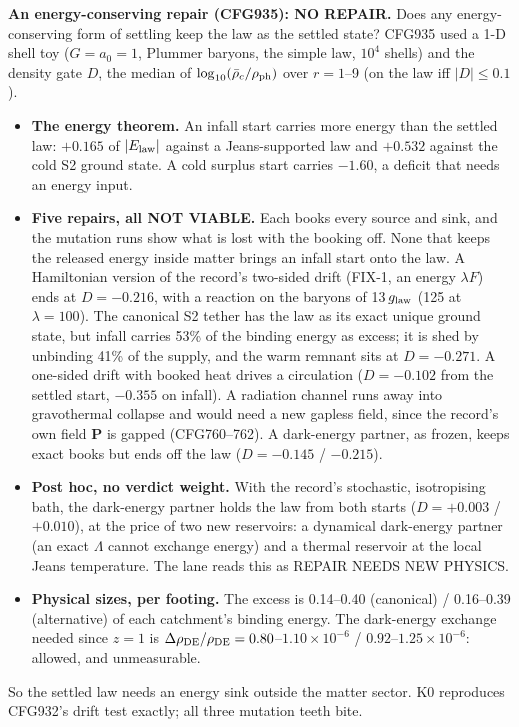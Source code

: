 \documentclass[10pt]{article}
\begin{document}
\textbf{An energy-conserving repair (CFG935): NO REPAIR.} Does any energy-conserving form of settling keep the law as the settled state? CFG935 used a 1-D shell toy ($G=a_0=1$, Plummer baryons, the simple law, $10^4$ shells) and the density gate $D$, the median of $\log_{10}(\bar\rho_c/\rho_{\rm ph})$ over $r=1$--9 (on the law iff $|D|\le0.1$).
\begin{itemize}
\item \textbf{The energy theorem.} An infall start carries more energy than the settled law: $+0.165$ of $|E_{\rm law}|$ against a Jeans-supported law and $+0.532$ against the cold S2 ground state. A cold surplus start carries $-1.60$, a deficit that needs an energy input.
\item \textbf{Five repairs, all NOT VIABLE.} Each books every source and sink, and the mutation runs show what is lost with the booking off. None that keeps the released energy inside matter brings an infall start onto the law. A Hamiltonian version of the record's two-sided drift (FIX-1, an energy $\lambda F$) ends at $D=-0.216$, with a reaction on the baryons of 13\,$g_{\rm law}$ (125 at $\lambda=100$). The canonical S2 tether has the law as its exact unique ground state, but infall carries 53\% of the binding energy as excess; it is shed by unbinding 41\% of the supply, and the warm remnant sits at $D=-0.271$. A one-sided drift with booked heat drives a circulation ($D=-0.102$ from the settled start, $-0.355$ on infall). A radiation channel runs away into gravothermal collapse and would need a new gapless field, since the record's own field $\mathbf P$ is gapped (CFG760--762). A dark-energy partner, as frozen, keeps exact books but ends off the law ($D=-0.145$ / $-0.215$).
\item \textbf{Post hoc, no verdict weight.} With the record's stochastic, isotropising bath, the dark-energy partner holds the law from both starts ($D=+0.003$ / $+0.010$), at the price of two new reservoirs: a dynamical dark-energy partner (an exact $\Lambda$ cannot exchange energy) and a thermal reservoir at the local Jeans temperature. The lane reads this as REPAIR NEEDS NEW PHYSICS.
\item \textbf{Physical sizes, per footing.} The excess is 0.14--0.40 (canonical) / 0.16--0.39 (alternative) of each catchment's binding energy. The dark-energy exchange needed since $z=1$ is $\Delta\rho_{\rm DE}/\rho_{\rm DE}=0.80$--$1.10\times10^{-6}$ / $0.92$--$1.25\times10^{-6}$: allowed, and unmeasurable.
\end{itemize}
So the settled law needs an energy sink outside the matter sector. K0 reproduces CFG932's drift test exactly; all three mutation teeth bite.
\end{document}
